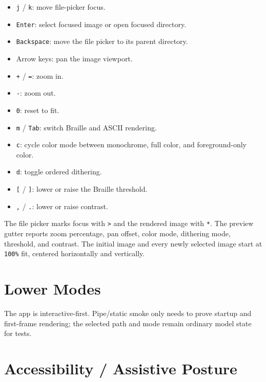 \begin{itemize}
\tightlist
\item
  \texttt{j} / \texttt{k}: move file-picker focus.
\item
  \texttt{E\allowbreak{}n\allowbreak{}t\allowbreak{}e\allowbreak{}r}: select focused image or open focused directory.
\item
  \texttt{B\allowbreak{}a\allowbreak{}c\allowbreak{}k\allowbreak{}s\allowbreak{}p\allowbreak{}a\allowbreak{}c\allowbreak{}e}: move the file picker to its parent directory.
\item
  Arrow keys: pan the image viewport.
\item
  \texttt{+} / \texttt{=}: zoom in.
\item
  \texttt{-}: zoom out.
\item
  \texttt{0}: reset to fit.
\item
  \texttt{m} / \texttt{T\allowbreak{}a\allowbreak{}b}: switch Braille and ASCII rendering.
\item
  \texttt{c}: cycle color mode between monochrome, full color, and foreground-only color.
\item
  \texttt{d}: toggle ordered dithering.
\item
  \texttt{[} / \texttt{]}: lower or raise the Braille threshold.
\item
  \texttt{,} / \texttt{.}: lower or raise contrast.
\end{itemize}

The file picker marks focus with \texttt{>} and the rendered image with \texttt{*}. The preview gutter reports zoom percentage, pan offset, color mode, dithering mode, threshold, and contrast. The initial image and every newly selected image start at \texttt{1\allowbreak{}0\allowbreak{}0\allowbreak{}\%} fit, centered horizontally and vertically.

\section{Lower Modes}\label{record-137-lower-modes}

The app is interactive-first. Pipe/static smoke only needs to prove startup and first-frame rendering; the selected path and mode remain ordinary model state for tests.

\section{Accessibility / Assistive Posture}\label{record-137-accessibility-assistive-posture}

